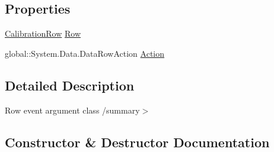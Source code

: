 \subsection*{Properties}
\begin{DoxyCompactItemize}
\item 
\hyperlink{class_env_int_1_1_win32_1_1_field_tech_1_1_manager_1_1_data_sets_1_1_guide_ware_mobile_data_set_1_1_calibration_row}{Calibration\+Row} \hyperlink{class_env_int_1_1_win32_1_1_field_tech_1_1_manager_1_1_data_sets_1_1_guide_ware_mobile_data_set_84870cfb39b084eaa7965416caa9d277_abb766214b6b73332f49d664c5f3c3137}{Row}
\item 
global\+::\+System.\+Data.\+Data\+Row\+Action \hyperlink{class_env_int_1_1_win32_1_1_field_tech_1_1_manager_1_1_data_sets_1_1_guide_ware_mobile_data_set_84870cfb39b084eaa7965416caa9d277_ab0201ca9cd3207f26c158c14326f1eb5}{Action}
\end{DoxyCompactItemize}


\subsection{Detailed Description}
Row event argument class /summary$>$ 

\subsection{Constructor \& Destructor Documentation}
\hypertarget{class_env_int_1_1_win32_1_1_field_tech_1_1_manager_1_1_data_sets_1_1_guide_ware_mobile_data_set_84870cfb39b084eaa7965416caa9d277_a5d466154e6509b066f61fa1f112ae001}{}
